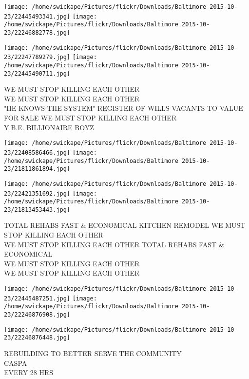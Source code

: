 \documentclass[10pt,letterpaper]{article}
\begin{document}
\texttt{[image: /home/swickape/Pictures/flickr/Downloads/Baltimore 2015-10-23/22445493341.jpg]}
\texttt{[image: /home/swickape/Pictures/flickr/Downloads/Baltimore 2015-10-23/22246882778.jpg]}

\texttt{[image: /home/swickape/Pictures/flickr/Downloads/Baltimore 2015-10-23/22247789279.jpg]}
\texttt{[image: /home/swickape/Pictures/flickr/Downloads/Baltimore 2015-10-23/22445490711.jpg]}

WE MUST STOP KILLING EACH OTHER\\
WE MUST STOP KILLING EACH OTHER\\
"HE KNOWS THE SYSTEM" REGISTER OF WILLS VACANTS TO VALUE FOR SALE WE MUST STOP KILLING EACH OTHER\\
Y.B.E. BILLIONAIRE BOYZ\\
\pagebreak

\texttt{[image: /home/swickape/Pictures/flickr/Downloads/Baltimore 2015-10-23/22408586466.jpg]}
\texttt{[image: /home/swickape/Pictures/flickr/Downloads/Baltimore 2015-10-23/21811861894.jpg]}

\texttt{[image: /home/swickape/Pictures/flickr/Downloads/Baltimore 2015-10-23/22421351692.jpg]}
\texttt{[image: /home/swickape/Pictures/flickr/Downloads/Baltimore 2015-10-23/21813453443.jpg]}

TOTAL REHABS FAST \& ECONOMICAL KITCHEN REMODEL WE MUST STOP KILLING EACH OTHER\\
WE MUST STOP KILLING EACH OTHER TOTAL REHABS FAST \& ECONOMICAL\\
WE MUST STOP KILLING EACH OTHER\\
WE MUST STOP KILLING EACH OTHER\\
\pagebreak

\texttt{[image: /home/swickape/Pictures/flickr/Downloads/Baltimore 2015-10-23/22445487251.jpg]}
\texttt{[image: /home/swickape/Pictures/flickr/Downloads/Baltimore 2015-10-23/22246876908.jpg]}

\vspace{0.25in}
\texttt{[image: /home/swickape/Pictures/flickr/Downloads/Baltimore 2015-10-23/22246876448.jpg]}

REBUILDING TO BETTER SERVE THE COMMUNITY\\
CASPA\\
EVERY 28 HRS\\
\pagebreak
\end{document}
